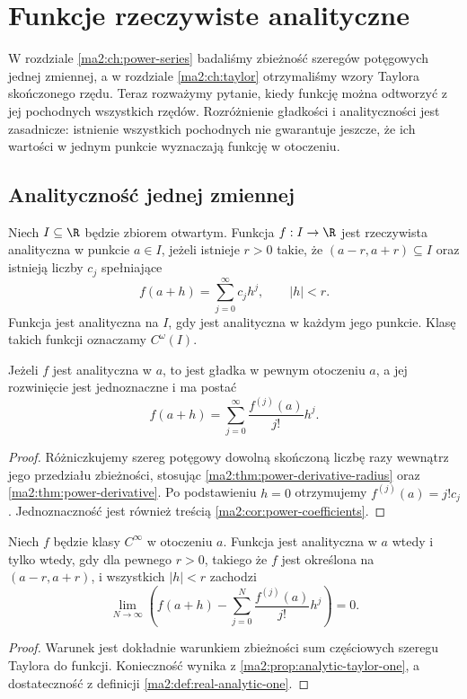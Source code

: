 \chapter{Funkcje rzeczywiste analityczne}
\label{ma2:ch:real-analytic}

W rozdziale \ref{ma2:ch:power-series} badaliśmy
zbieżność szeregów potęgowych jednej zmiennej,
a w rozdziale \ref{ma2:ch:taylor} otrzymaliśmy
wzory Taylora skończonego rzędu.
Teraz rozważymy pytanie, kiedy funkcję można
odtworzyć z jej pochodnych wszystkich rzędów.
Rozróżnienie gładkości i analityczności jest
zasadnicze: istnienie wszystkich pochodnych
nie gwarantuje jeszcze, że ich wartości
w jednym punkcie wyznaczają funkcję w otoczeniu.

\section{Analityczność jednej zmiennej}

\begin{definicja}
\label{ma2:def:real-analytic-one}
Niech $I\subseteq\R$ będzie zbiorem otwartym.
Funkcja $f:I\to\R$ jest rzeczywista analityczna
w punkcie $a\in I$, jeżeli istnieje $r>0$
takie, że $(a-r,a+r)\subseteq I$ oraz
istnieją liczby $c_j$ spełniające
\[
 f(a+h)=\sum_{j=0}^\infty c_jh^j,\qquad |h|<r.
\]
Funkcja jest analityczna na $I$, gdy jest
analityczna w każdym jego punkcie.
Klasę takich funkcji oznaczamy $C^\omega(I)$.
\end{definicja}

\begin{stwierdzenie}
\label{ma2:prop:analytic-taylor-one}
Jeżeli $f$ jest analityczna w $a$, to
jest gładka w pewnym otoczeniu $a$, a jej
rozwinięcie jest jednoznaczne i ma postać
\[
 f(a+h)=\sum_{j=0}^\infty
 \frac{f^{(j)}(a)}{j!}h^j.
\]
\end{stwierdzenie}
\begin{proof}
Różniczkujemy szereg potęgowy dowolną
skończoną liczbę razy wewnątrz jego przedziału
zbieżności, stosując
\ref{ma2:thm:power-derivative-radius}
oraz \ref{ma2:thm:power-derivative}.
Po podstawieniu $h=0$ otrzymujemy
$f^{(j)}(a)=j!c_j$.
Jednoznaczność jest również treścią
\ref{ma2:cor:power-coefficients}.
\end{proof}

\begin{stwierdzenie}
\label{ma2:prop:analytic-taylor-remainder}
Niech $f$ będzie klasy $C^\infty$ w otoczeniu $a$.
Funkcja jest analityczna w $a$ wtedy i tylko wtedy,
gdy dla pewnego $r>0$, takiego że $f$ jest
określona na $(a-r,a+r)$, i wszystkich $|h|<r$
zachodzi
\[
 \lim_{N\to\infty}
 \left(f(a+h)-\sum_{j=0}^N
 \frac{f^{(j)}(a)}{j!}h^j\right)=0.
\]
\end{stwierdzenie}
\begin{proof}
Warunek jest dokładnie warunkiem zbieżności
sum częściowych szeregu Taylora do funkcji.
Konieczność wynika z
\ref{ma2:prop:analytic-taylor-one},
a dostateczność z definicji
\ref{ma2:def:real-analytic-one}.
\end{proof}

